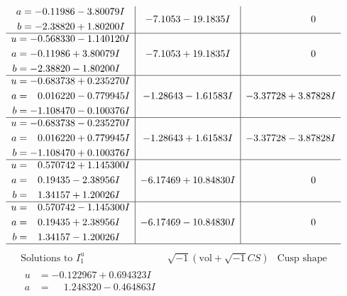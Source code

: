 \documentclass[1p]{elsarticle_modified}
\theoremstyle{definition}
\newcommand{\I}{\sqrt{-1}}
\begin{document}
$$\begin{array}{c|c|c}
\begin{aligned}
a &= -0.11986 - 3.80079 I \\
b &= -2.38820 + 1.80200 I\end{aligned}
 & -7.1053 - 19.1835 I & \phantom{-0.000000 } 0 \\ \hline\begin{aligned}
u &= -0.568330 - 1.140120 I \\
a &= -0.11986 + 3.80079 I \\
b &= -2.38820 - 1.80200 I\end{aligned}
 & -7.1053 + 19.1835 I & \phantom{-0.000000 } 0 \\ \hline\begin{aligned}
u &= -0.683738 + 0.235270 I \\
a &= \phantom{-}0.016220 - 0.779945 I \\
b &= -1.108470 - 0.100376 I\end{aligned}
 & -1.28643 - 1.61583 I & -3.37728 + 3.87828 I \\ \hline\begin{aligned}
u &= -0.683738 - 0.235270 I \\
a &= \phantom{-}0.016220 + 0.779945 I \\
b &= -1.108470 + 0.100376 I\end{aligned}
 & -1.28643 + 1.61583 I & -3.37728 - 3.87828 I \\ \hline\begin{aligned}
u &= \phantom{-}0.570742 + 1.145300 I \\
a &= \phantom{-}0.19435 - 2.38956 I \\
b &= \phantom{-}1.34157 + 1.20026 I\end{aligned}
 & -6.17469 + 10.84830 I & \phantom{-0.000000 } 0 \\ \hline\begin{aligned}
u &= \phantom{-}0.570742 - 1.145300 I \\
a &= \phantom{-}0.19435 + 2.38956 I \\
b &= \phantom{-}1.34157 - 1.20026 I\end{aligned}
 & -6.17469 - 10.84830 I & \phantom{-0.000000 } 0\\
 \hline 
 \end{array}$$\newpage$$\begin{array}{c|c|c}  
\text{Solutions to }I^u_{1}& \I (\text{vol} + \sqrt{-1}CS) & \text{Cusp shape}\\
 \hline 
\begin{aligned}
u &= -0.122967 + 0.694323 I \\
a &= \phantom{-}1.248320 - 0.464863 I \\

\end{aligned}
\end{array}$$
\end{document}
